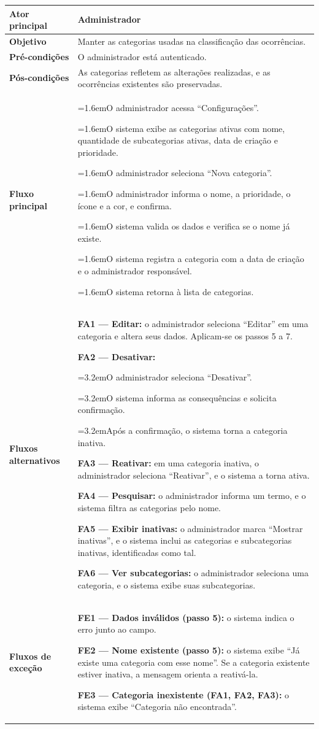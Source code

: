 \documentclass[12pt,a4paper]{article}
\newcommand{\ucitem}[2]{\par\noindent\hangindent=1.6em\hangafter=1\makebox[1.6em][l]{#1}#2}
\newcommand{\ucsubitem}[2]{\par\noindent\hangindent=3.2em\hangafter=1\hspace*{1.6em}\makebox[1.6em][l]{#1}#2}
\begin{document}
\begin{longtable}{|p{}|p{}|}
\hline
\endfoot
\textbf{Ator principal} & Administrador \\ \hline
\textbf{Objetivo} & Manter as categorias usadas na classificação das ocorrências. \\ \hline
\textbf{Pré-condições} & O administrador está autenticado. \\ \hline
\textbf{Pós-condições} & As categorias refletem as alterações realizadas, e as ocorrências existentes são preservadas. \\ \hline
\textbf{Fluxo principal} &
\ucitem{1.}{O administrador acessa ``Configurações''.}
\ucitem{2.}{O sistema exibe as categorias ativas com nome, quantidade de subcategorias ativas, data de criação e prioridade.}
\ucitem{3.}{O administrador seleciona ``Nova categoria''.}
\ucitem{4.}{O administrador informa o nome, a prioridade, o ícone e a cor, e confirma.}
\ucitem{5.}{O sistema valida os dados e verifica se o nome já existe.}
\ucitem{6.}{O sistema registra a categoria com a data de criação e o administrador responsável.}
\ucitem{7.}{O sistema retorna à lista de categorias.} \\ \hline
\textbf{Fluxos alternativos} &
\noindent \textbf{FA1 — Editar:} o administrador seleciona ``Editar'' em uma categoria e altera seus dados. Aplicam-se os passos 5 a 7.
\par\smallskip\noindent \textbf{FA2 — Desativar:}
\ucsubitem{1.}{O administrador seleciona ``Desativar''.}
\ucsubitem{2.}{O sistema informa as consequências e solicita confirmação.}
\ucsubitem{3.}{Após a confirmação, o sistema torna a categoria inativa.}
\par\smallskip\noindent \textbf{FA3 — Reativar:} em uma categoria inativa, o administrador seleciona ``Reativar'', e o sistema a torna ativa.
\par\smallskip\noindent \textbf{FA4 — Pesquisar:} o administrador informa um termo, e o sistema filtra as categorias pelo nome.
\par\smallskip\noindent \textbf{FA5 — Exibir inativas:} o administrador marca ``Mostrar inativas'', e o sistema inclui as categorias e subcategorias inativas, identificadas como tal.
\par\smallskip\noindent \textbf{FA6 — Ver subcategorias:} o administrador seleciona uma categoria, e o sistema exibe suas subcategorias. \\ \hline
\textbf{Fluxos de exceção} &
\noindent \textbf{FE1 — Dados inválidos (passo 5):} o sistema indica o erro junto ao campo.
\par\smallskip\noindent \textbf{FE2 — Nome existente (passo 5):} o sistema exibe ``Já existe uma categoria com esse nome''. Se a categoria existente estiver inativa, a mensagem orienta a reativá-la.
\par\smallskip\noindent \textbf{FE3 — Categoria inexistente (FA1, FA2, FA3):} o sistema exibe ``Categoria não encontrada''. \\
\end{longtable}
\end{document}
